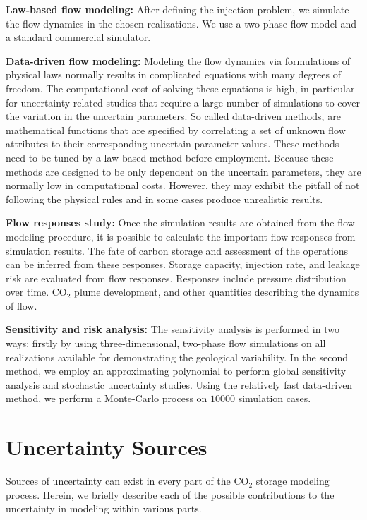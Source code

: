 \textbf{Law-based flow modeling:} After defining the injection problem, we
simulate the flow dynamics in the chosen realizations. We use a two-phase flow model and a standard commercial simulator.


\textbf{Data-driven flow modeling:} Modeling the flow dynamics via formulations
of physical laws normally results in complicated equations with many degrees of
freedom. The computational cost of solving these equations is high, in
particular for uncertainty related studies that require
a large number of simulations to cover the variation in the uncertain
parameters. So called data-driven methods, are mathematical functions that are specified by correlating a set of unknown flow attributes to their corresponding uncertain parameter values. These methods need to be tuned by a law-based method before employment. Because these methods are designed to be only dependent on the uncertain parameters, they are normally low in computational costs. However, they may exhibit the pitfall of not following the physical rules and in some cases produce unrealistic results. 


\textbf{Flow responses study:} Once the simulation results are obtained from the
flow modeling procedure, it is possible to calculate the important flow
responses from simulation results. The fate of carbon storage and assessment of
the operations can be inferred from these responses. Storage capacity, injection rate, and leakage risk are evaluated from flow responses. Responses include pressure distribution over time. $\mbox{CO}_2$ plume development, and other quantities describing the dynamics of flow. 

\textbf{Sensitivity and risk analysis:} The sensitivity analysis is performed
in two ways: firstly by using three-dimensional, two-phase flow simulations on all realizations available for demonstrating the geological variability. In the second method, we employ an
approximating polynomial to perform global sensitivity analysis and
stochastic uncertainty studies. Using  the relatively fast data-driven method,
we perform a Monte-Carlo process on $10000$ simulation cases. 

\section{Uncertainty Sources}
\label{uncertaintySources}

Sources of uncertainty can exist in every part of the $\mbox{CO}_2$ storage modeling
process. Herein, we briefly describe each of the possible contributions to the
uncertainty in modeling within various parts.

